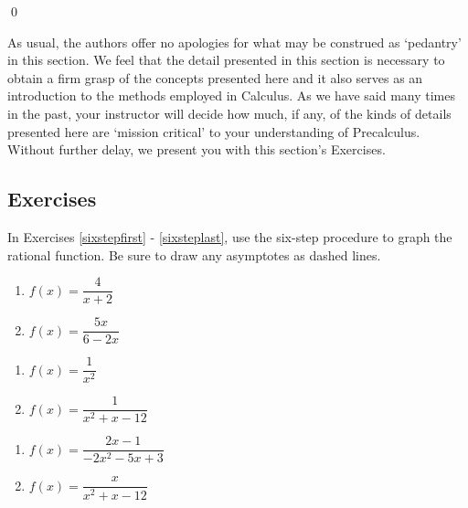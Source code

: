 \vspace{-.35in} \qed

\medskip

As usual, the authors offer no apologies for what may be construed as `pedantry' in this section.  We feel that the detail presented in this section is necessary to obtain a firm grasp of the concepts presented here and it also serves as an introduction to the methods employed in Calculus.  As we have said many times in the past, your instructor will decide how much, if any, of the kinds of details presented here are `mission critical' to your understanding of Precalculus. Without further delay, we present you with this section's Exercises.

\newpage

\subsection{Exercises}

In Exercises \ref{sixstepfirst} - \ref{sixsteplast}, use the six-step procedure to graph the rational function.  Be sure to draw any asymptotes as dashed lines.

\begin{multicols}{2}
\begin{enumerate}

\item $f(x) = \dfrac{4}{x + 2}$ \label{sixstepfirst}
\item $f(x) = \dfrac{5x}{6 - 2x}$

\setcounter{HW}{\value{enumi}}
\end{enumerate}
\end{multicols}

\begin{multicols}{2}
\begin{enumerate}
\setcounter{enumi}{\value{HW}}

\item $f(x) = \dfrac{1}{x^{2}}$
\item $f(x) = \dfrac{1}{x^{2} + x - 12}$

\setcounter{HW}{\value{enumi}}
\end{enumerate}
\end{multicols}

\begin{multicols}{2}
\begin{enumerate}
\setcounter{enumi}{\value{HW}}

\item $f(x) = \dfrac{2x - 1}{-2x^{2} - 5x + 3}$
\item $f(x) = \dfrac{x}{x^{2} + x - 12}$ 

\setcounter{HW}{\value{enumi}}
\end{enumerate}
\end{multicols}

